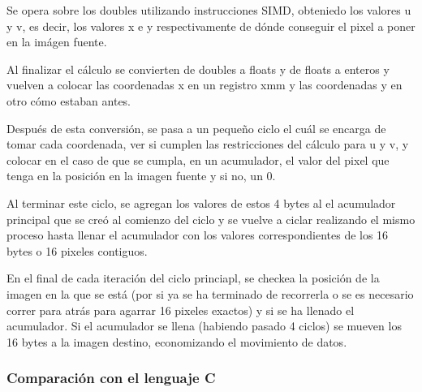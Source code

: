 Se opera sobre los doubles utilizando instrucciones SIMD, obteniedo los valores u y v, es decir, los valores x e y respectivamente de dónde conseguir el pixel a poner en la imágen fuente.

Al finalizar el cálculo se convierten de doubles a floats y de floats a enteros y vuelven a colocar las coordenadas x en un registro xmm y las coordenadas y en otro cómo estaban antes.

Después de esta conversión, se pasa a un pequeño ciclo el cuál se encarga de tomar cada coordenada, ver si cumplen las restricciones del cálculo para u y v, y colocar en el caso de que se cumpla, en un acumulador, el valor del pixel que tenga en la posición en la imagen fuente y si no, un 0.

Al terminar este ciclo, se agregan los valores de estos 4 bytes al el acumulador principal que se creó al comienzo del ciclo y se vuelve a ciclar realizando el mismo proceso hasta llenar el acumulador con los valores correspondientes de los 16 bytes o 16 pixeles contiguos.

En el final de cada iteración del ciclo princiapl, se checkea la posición de la imagen en la que se está (por si ya se ha terminado de recorrerla o se es necesario correr para atrás para agarrar 16 pixeles exactos) y si se ha llenado el acumulador. Si el acumulador se llena (habiendo pasado 4 ciclos) se mueven los 16 bytes a la imagen destino, economizando el movimiento de datos.

\subsubsection{Comparación con el lenguaje C}
